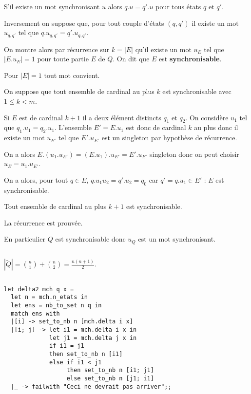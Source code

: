 \subsubsection{}\label{ques:carac}
S'il existe un mot synchronisant $u$ alors $q.u = q'.u$ pour tous états $q$ et $q'$.

\medskip

Inversement on suppose que, pour tout couple d'états $(q,q')$ il existe un mot $u_{q,q'}$ tel que $q.u_{q,q'}=q'.u_{q,q'}$.

On montre alors par récurrence sur $k=|E|$ qu'il existe un mot $u_E$ tel que $|E.u_E| = 1$ pour toute partie $E$ de $Q$.
On dit que $E$ est {\bf synchronisable}.

Pour $|E|=1$ tout mot convient.

On suppose que tout ensemble de cardinal au plus $k$ est synchronisable avec $1\le k < m$.

Si $E$ est de cardinal $k+1$ il a deux élément distincts $q_1$ et $q_2$. On considère $u_1$ tel que $q_1.u_1=q_2.u_1$. L'ensemble $E'=E.u_1$ est donc de cardinal $k$ au plus donc il existe un mot $u_{E'}$ tel que $E'.u_{E'}$ est un singleton par hypothèse de récurrence. 

On a alors 
$E.(u_1.u_{E'}) = (E.u_1).u_{E'} = E'.u_{E'}$ singleton  donc on peut choisir $u_E = u_1.u_{E'}$.

On a alors, pour tout $q\in E$, $q.u_1u_2=q'.u_2=q_0$ car $q'=q.u_1\in E'$ : $E$ est synchronisable.

Tout ensemble de cardinal au plus $k+1$ est synchronisable.

La récurrence est prouvée.

En particulier $Q$ est synchronisable donc $u_Q$ est un mot synchronisant.
\subsection{}
$|\widetilde Q| = \binom n1 + \binom n2=\frac{n(n+1)}2$.
\subsection{}
\begin{lstlisting}
let delta2 mch q x =
  let n = mch.n_etats in
  let ens = nb_to_set n q in
  match ens with
  |[i] -> set_to_nb n [mch.delta i x]
  |[i; j] -> let i1 = mch.delta i x in
             let j1 = mch.delta j x in
             if i1 = j1
             then set_to_nb n [i1]
             else if i1 < j1
                  then set_to_nb n [i1; j1]
                  else set_to_nb n [j1; i1]
  |_ -> failwith "Ceci ne devrait pas arriver";;
\end{lstlisting}
